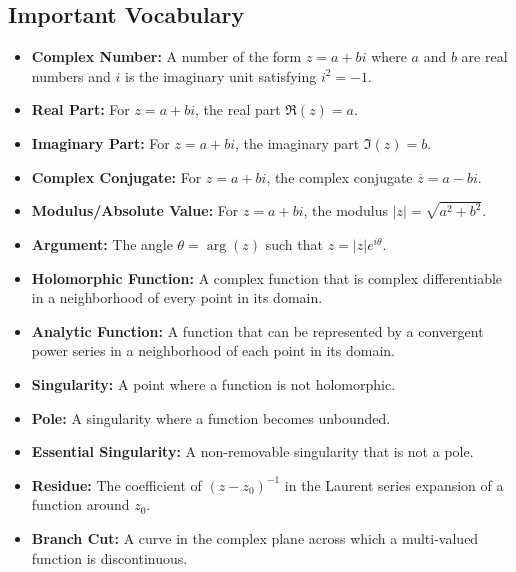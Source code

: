 \subsection*{Important Vocabulary}
\begin{itemize}
    \item \textbf{Complex Number:} A number of the form $z = a + bi$ where $a$ and $b$ are real numbers and $i$ is the imaginary unit satisfying $i^2 = -1$.
    
    \item \textbf{Real Part:} For $z = a + bi$, the real part $\Re(z) = a$.
    
    \item \textbf{Imaginary Part:} For $z = a + bi$, the imaginary part $\Im(z) = b$.
    
    \item \textbf{Complex Conjugate:} For $z = a + bi$, the complex conjugate $\overline{z} = a - bi$.
    
    \item \textbf{Modulus/Absolute Value:} For $z = a + bi$, the modulus $|z| = \sqrt{a^2 + b^2}$.
    
    \item \textbf{Argument:} The angle $\theta = \arg(z)$ such that $z = |z|e^{i\theta}$.
    
    \item \textbf{Holomorphic Function:} A complex function that is complex differentiable in a neighborhood of every point in its domain.
    
    \item \textbf{Analytic Function:} A function that can be represented by a convergent power series in a neighborhood of each point in its domain.
    
    \item \textbf{Singularity:} A point where a function is not holomorphic.
    
    \item \textbf{Pole:} A singularity where a function becomes unbounded.
    
    \item \textbf{Essential Singularity:} A non-removable singularity that is not a pole.
    
    \item \textbf{Residue:} The coefficient of $(z-z_0)^{-1}$ in the Laurent series expansion of a function around $z_0$.
    
    \item \textbf{Branch Cut:} A curve in the complex plane across which a multi-valued function is discontinuous.
    

\end{itemize}
